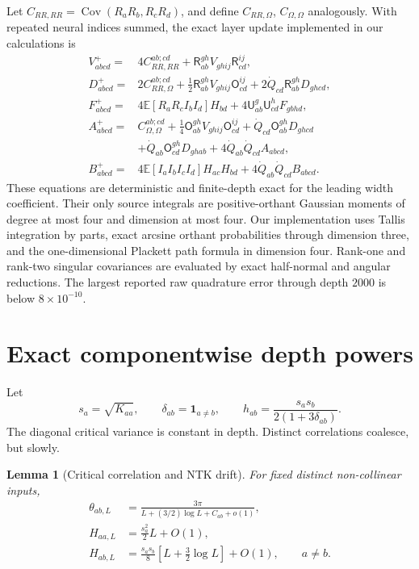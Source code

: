 \documentclass{article}
\newtheorem{lemma}[theorem]{Lemma}
\newcommand{\E}{\mathbb E}
\newcommand{\Cov}{\operatorname{Cov}}
\newcommand{\ind}{\mathbf 1}
\begin{document}
Let \(C_{RR,RR}=\Cov(R_aR_b,R_cR_d)\), and define
\(C_{RR,\Omega}\), \(C_{\Omega,\Omega}\) analogously.  With repeated neural
indices summed, the exact layer update implemented in our calculations is
\begin{align}
V^+_{abcd}
={}&4C_{RR,RR}^{ab;cd}
+\mathsf R_{ab}^{gh}V_{ghij}\mathsf R_{cd}^{ij},\label{eq:V-rec}\\
D^+_{abcd}
={}&2C_{RR,\Omega}^{ab;cd}
+\frac12\mathsf R_{ab}^{gh}V_{ghij}\mathsf O_{cd}^{ij}
+2\dot Q_{cd}\mathsf R_{ab}^{gh}D_{ghcd},\label{eq:D-rec}\\
F^+_{abcd}
={}&4\E[R_aR_cI_bI_d]H_{bd}
+4\mathsf U_{ab}^{g}\mathsf U_{cd}^{h}F_{gbhd},\label{eq:F-rec}\\
A^+_{abcd}
={}&C_{\Omega,\Omega}^{ab;cd}
+\frac14\mathsf O_{ab}^{gh}V_{ghij}\mathsf O_{cd}^{ij}
+\dot Q_{cd}\mathsf O_{ab}^{gh}D_{ghcd}\nonumber\\
&+\dot Q_{ab}\mathsf O_{cd}^{gh}D_{ghab}
+4\dot Q_{ab}\dot Q_{cd}A_{abcd},\label{eq:A-rec}\\
B^+_{abcd}
={}&4\E[I_aI_bI_cI_d]H_{ac}H_{bd}
+4\dot Q_{ab}\dot Q_{cd}B_{abcd}.
\label{eq:B-rec}
\end{align}
These equations are deterministic and finite-depth exact for the leading
width coefficient.  Their only source integrals are positive-orthant Gaussian
moments of degree at most four and dimension at most four.  Our implementation
uses Tallis integration by parts, exact arcsine orthant probabilities through
dimension three, and the one-dimensional Plackett path formula in dimension
four.  Rank-one and rank-two singular covariances are evaluated by exact
half-normal and angular reductions.  The largest reported raw quadrature
error through depth \(2000\) is below \(8\times10^{-10}\).

\section{Exact componentwise depth powers}
\label{sec:depth}

Let
\begin{equation}
s_a=\sqrt{K_{aa}},\qquad \delta_{ab}=\ind_{a\ne b},\qquad
h_{ab}=\frac{s_as_b}{2(1+3\delta_{ab})}.
\label{eq:s-h}
\end{equation}
The diagonal critical variance is constant in depth.  Distinct correlations
coalesce, but slowly.

\begin{lemma}[Critical correlation and NTK drift]
\label{lem:critical-drift}
For fixed distinct non-collinear inputs,
\begin{align}
\theta_{ab,L}
&=\frac{3\pi}{L+(3/2)\log L+C_{ab}+o(1)},\label{eq:theta-log}\\
H_{aa,L}&=\frac{s_a^2}{2}L+O(1),\label{eq:H-diag}\\
H_{ab,L}&=\frac{s_as_b}{8}
\left[L+\frac32\log L\right]+O(1),\qquad a\ne b.
\label{eq:H-off}
\end{align}
\end{lemma}
\end{document}
